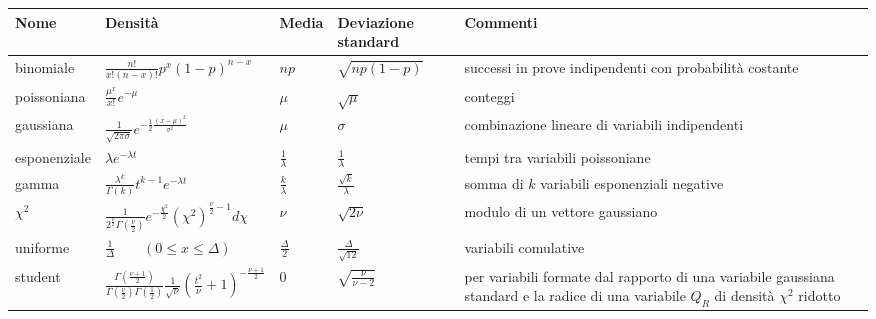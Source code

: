 \begin{tabularx}{\textwidth}{llXXX}
\toprule
Nome & Densità & Media & Deviazione standard & Commenti \\
\midrule
binomiale & $\frac { n! }{ x!(n-x)! } { p }^{ x }{ \left( 1-p \right)  }^{ n-x }$ & $np$ & $\sqrt { np\left( 1-p \right)  } $ & successi in prove indipendenti con probabilità costante \\
poissoniana & $\frac { { \mu  }^{ x } }{ x! } { e }^{ -\mu  }$ & $\mu$ & $\sqrt { \mu  } $ & conteggi \\
gaussiana & $\frac { 1 }{ \sqrt { 2\pi \sigma  }  } { e }^{ -\frac { 1 }{ 2 } \frac { { \left( x-\mu  \right)  }^{ 2 } }{ { \sigma  }^{ 2 } }  }$ & $\mu$ & $\sigma$ & combinazione lineare di variabili indipendenti \\
esponenziale & $\lambda { e }^{ -\lambda t }$ & $\frac { 1 }{ \lambda  } $ & $\frac { 1 }{ \lambda  } $ & tempi tra variabili poissoniane \\
gamma & $\frac { { \lambda  }^{ k } }{ \Gamma \left( k \right)  } { t }^{ k-1 }{ e }^{ -\lambda t }$ & $\frac { k }{ \lambda  } $ & $\frac { \sqrt { k }  }{ \lambda  } $ & somma di $k$ variabili esponenziali negative \\
$\chi^2$ & $\frac { 1 }{ { 2 }^{ \frac { \nu  }{ 2 }  }\Gamma \left( \frac { \nu  }{ 2 }  \right)  } { e }^{ -\frac { { \chi  }^{ 2 } }{ 2 }  }{ \left( { \chi  }^{ 2 } \right)  }^{ \frac { \nu  }{ 2 } -1 }{ d }{ \chi  }$ & $\nu$ & $\sqrt { 2\nu  } $ & modulo di un vettore gaussiano \\
uniforme & $\frac { 1 }{ \Delta  } \qquad \left( 0\le x\le \Delta  \right) $ & $\frac { \Delta }{ 2 } $ & $\frac { \Delta  }{ \sqrt { 12 }  } $ & variabili comulative \\
student & $\frac { \Gamma \left( \frac { \nu +1 }{ 2 }  \right)  }{ \Gamma \left( \frac { \nu  }{ 2 }  \right) \Gamma \left( \frac { 1 }{ 2 }  \right)  } \frac { 1 }{ \sqrt { \nu  }  } { \left( \frac { t^{ 2 } }{ \nu  } +1 \right)  }^{ -\frac { \nu +1 }{ 2 }  }$ & $0$ & $\sqrt { \frac { \nu  }{ \nu -2 }  } $ & per variabili formate dal rapporto di una variabile gaussiana standard e la radice di una variabile $Q_R$ di densità $\chi^2$ ridotto\\
\bottomrule
\end{tabularx}